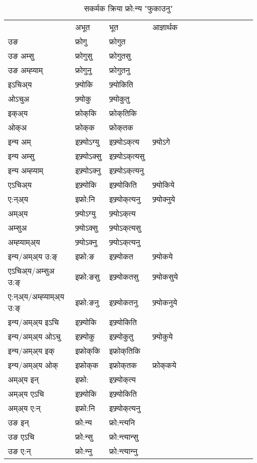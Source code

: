 \begin{table}[H]
\centering
\caption{\label{ok.vt} सकर्मक क्रिया  फ्रो:न्य  "फुकाउनु"  }
\begin{tabular}{l|l|l|l|l|l|l|l|l|l|l|l|l}  \toprule
&अभूत & भूत & आज्ञार्थक \\ 
उङ &फ्रोगु &फ्रोगुत \\ 
उङ अम्सु &फ्रोगुसु &फ्रोगुतसु \\ 
उङ अम्ह्‍याम् &फ्रोगुनु &फ्रोगुतनु \\ 
इऽचिअ्य &फ्र्योकि &फ्र्योकिति   \\ 
ओऽचुअ &फ्र्योकु &फ्र्योकुतु   \\ 
इक्अ्य &फ्रोक्‌कि &फ्रोक्‌तिकि   \\ 
ओक्अ &फ्रोक्‌क &फ्रोक्‌तक   \\ 
इन्य अम् & इफ्र्योऽग्यु  & इफ्र्योऽक्‌त्य &फ्र्योऽगे  \\ 
इन्य अम्सु & इफ्र्योऽक्सु  & इफ्र्योऽक्‌त्यसु   \\ 
इन्य अम्ह्‍याम् & इफ्र्योऽक्‍नु  & इफ्र्योऽक्‌त्यनु   \\ 
एऽचिअ्य & इफ्र्योकि & इफ्र्योकिति &फ्र्योकिये    \\ 
ए:न्अ्य & इफ्रो:नि  & इफ्र्योक्‌त्यनु &फ्र्योक्‍नुये  \\ 
अम्अ्य & फ्र्योऽग्यु  & फ्र्योऽक्‌त्य  \\ 
अम्सुअ & फ्र्योऽक्सु & फ्र्योऽक्‌त्यसु  \\ 
अम्ह्‍याम्अ्य & फ्र्योऽक्‍नु  & फ्र्योऽक्‌त्यनु \\ 
\midrule
इन्य/अम्अ्य उ:ङ्‌&इफ्रो:ङ & इफ्र्योकत &फ्र्योकये \\ 
एऽचिअ्य/अम्सुअ उ:ङ्‌ &इफ्रो:ङसु & इफ्र्योकतसु &फ्र्योकसुये \\ 
ए:न्अ्य/अम्ह्‍याम्अ्य उ:ङ्‌ &इफ्रो:ङनु & इफ्र्योकतनु &फ्र्योकनुये \\ 
इन्य/अम्अ्य इऽचि & इफ्र्योकि & इफ्र्योकिति    \\ 
इन्य/अम्अ्य ओऽचु & इफ्र्योकु & इफ्र्योकुतु  &फ्र्योकुये  \\ 
इन्य/अम्अ्य इक् & इफ्रोक्‌कि & इफ्रोक्‌तिकि   \\ 
इन्य/अम्अ्य ओक् & इफ्रोक्‌क & इफ्रोक्‌तक  &फ्रोक्‌कये  \\ 
अम्अ्य इन् & इफ्रो: & इफ्र्योक्‌त्य   \\ 
अम्अ्य एऽचि & इफ्र्योकि & इफ्र्योकिति    \\ 
अम्अ्य ए:न् & इफ्रो:नि  & इफ्र्योक्‌त्यनु  \\ 
\midrule
उङ इन् & फ्रो:न्य  & फ्रो:न्त्यनि  \\ 
उङ एऽचि & फ्रो:न्सु  & फ्रो:न्त्यान्सु   \\ 
उङ ए:न्& फ्रो:न्‍नु  & फ्रो:न्त्यान्‍नु   \\ 
\bottomrule
\end{tabular}
\end{table}


